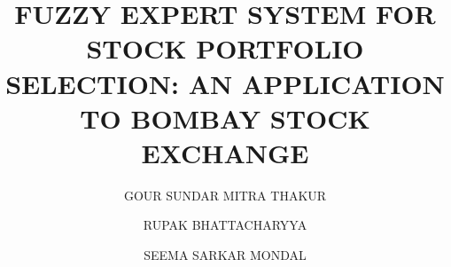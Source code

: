 \documentclass{ws-ijufks}
\begin{document}

%
%

\title{FUZZY EXPERT SYSTEM FOR STOCK PORTFOLIO SELECTION: AN APPLICATION TO BOMBAY STOCK EXCHANGE} 

\author{GOUR SUNDAR MITRA THAKUR}


\address{Department of Computer Science and Engineering,\\ Dr. B. C. Roy Engg. College, Durgapur, West Bengal, India\\
	cse.gsmt@gmail.com}


\author{RUPAK BHATTACHARYYA}

\address{Department of Mathematics,\\ Bijoy Krishna Girls' College, Howrah, West Bengal, India\\
mathsrup@gmail.com}

\author{SEEMA SARKAR MONDAL}

\address{Department of Mathematics\\ National Institute of Technology Durgapur, West Bengal, India\\
	seemasarkarmondal@yahoo.co.in}

\maketitle

\end{document}
